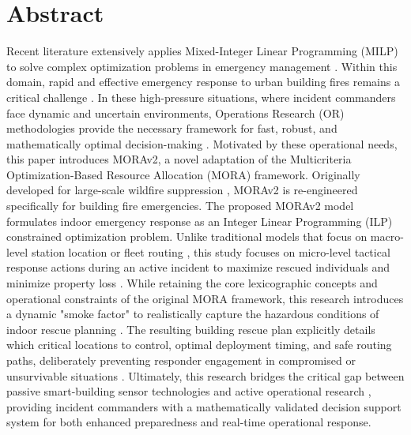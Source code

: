 \section{Abstract}
\label{sec:abstract}

Recent literature extensively applies Mixed-Integer Linear Programming (MILP) to solve complex optimization problems in emergency management
. Within this domain, rapid and effective emergency response to urban building fires remains a critical challenge
. In these high-pressure situations, where incident commanders face dynamic and uncertain environments, Operations Research (OR) methodologies provide the necessary framework for fast, robust, and mathematically optimal decision-making
. Motivated by these operational needs, this paper introduces MORAv2, a novel adaptation of the Multicriteria Optimization-Based Resource Allocation (MORA) framework. Originally developed for large-scale wildfire suppression
, MORAv2 is re-engineered specifically for building fire emergencies.
The proposed MORAv2 model formulates indoor emergency response as an Integer Linear Programming (ILP) constrained optimization problem. Unlike traditional models that focus on macro-level station location or fleet routing
, this study focuses on micro-level tactical response actions during an active incident to maximize rescued individuals and minimize property loss
. While retaining the core lexicographic concepts and operational constraints of the original MORA framework, this research introduces a dynamic "smoke factor" to realistically capture the hazardous conditions of indoor rescue planning
. The resulting building rescue plan explicitly details which critical locations to control, optimal deployment timing, and safe routing paths, deliberately preventing responder engagement in compromised or unsurvivable situations
. Ultimately, this research bridges the critical gap between passive smart-building sensor technologies and active operational research
, providing incident commanders with a mathematically validated decision support system for both enhanced preparedness and real-time operational response.